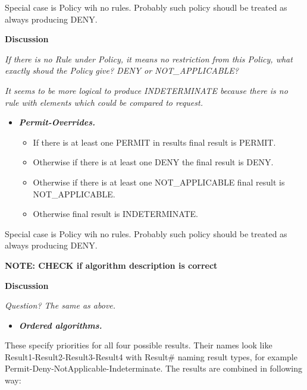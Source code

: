 \documentclass[a4paper]{article}
\newcommand\liststyleWWviiiNumxxi{%
\renewcommand\labelitemi{[F0B7?]}
\renewcommand\labelitemii{o}
\renewcommand\labelitemiii{[F0A7?]}
\renewcommand\labelitemiv{[F0B7?]}
}
\begin{document}
{\color{black}
Special case is Policy wih no rules. Probably such policy shoudl be
treated as always producing DENY.}

{\bfseries\color{black}
Discussion}

{\itshape\color{black}
If there is no Rule under Policy, it means no restriction from this
Policy, what exactly shoud the Policy give? DENY or NOT\_APPLICABLE?}

{\itshape\color{black}
It seems to be more logical to produce INDETERMINATE because there is no
rule with elements which could be compared to request.}

\liststyleWWviiiNumxxi
\begin{itemize}
\item {\bfseries\itshape\color{black}
Permit-Overrides.}

\begin{itemize}
\item {\color{black}
If there is at least one PERMIT in results final result is PERMIT.}
\item {\color{black}
Otherwise if there is at least one DENY the final result is DENY.}
\item {\color{black}
Otherwise if there is at least one NOT\_APPLICABLE final result is
NOT\_APPLICABLE.}
\item {\color{black}
Otherwise final result is INDETERMINATE.}
\end{itemize}
\end{itemize}
{\color{black}
Special case is Policy wih no rules. Probably such policy should be
treated as always producing DENY.}

{\bfseries\color{black}
NOTE: CHECK if algorithm description is correct}

{\bfseries\color{black}
Discussion}

{\itshape\color{black}
Question? The same as above.}

\liststyleWWviiiNumxxi
\begin{itemize}
\item {\bfseries\itshape\color{black}
Ordered algorithms.}
\end{itemize}
{\color{black}
These specify priorities for all four possible results. Their names look
like Result1-Result2-Result3-Result4 with Result\# naming result types,
for example Permit-Deny-NotApplicable-Indeterminate. The results are
combined in following way:}
\end{document}
